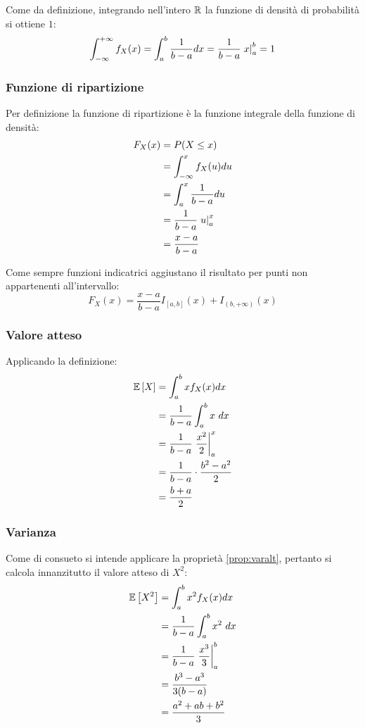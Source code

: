 Come da definizione, integrando nell'intero $\mathbb R$ la funzione di densità di probabilità si ottiene $1$:
\begin{equation*}
	\int_{-\infty}^{+\infty}f_X(x) = \int_a^b\frac{1}{b-a}dx = \frac{1}{b-a} \left. x \right\rvert_{a}^{b} = 1
\end{equation*}


\subsubsection{Funzione di ripartizione}
Per definizione la funzione di ripartizione è la funzione integrale della funzione di densità:
\begin{align*}
	F_X(x) & = P(X\leq x)                   \\
	       & = \int_{-\infty}^x f_X(u)du    \\
	       & = \int_a^x \frac{1}{b-a}du     \\
	       & = \frac{1}{b-a} \left. u \right\rvert_{a}^{x} \\
	       & = \frac{x-a}{b-a}
\end{align*}

Come sempre funzioni indicatrici aggiustano il risultato per punti non appartenenti all'intervallo:
\begin{equation*}
	F_X(x) = \frac{x-a}{b-a} I_{[a,b]}(x) + I_{(b,+\infty)}(x)
\end{equation*}


\subsubsection{Valore atteso}
Applicando la definizione:
\begin{align*}
	\mathbb{E}\left[ X \right] & = \int_a^b x f_X(x)dx                      \\
	       & = \frac{1}{b-a} \int_a^b x ~ dx            \\
	       & = \frac{1}{b-a} \left. \frac{x^2}{2} \right\rvert_{a}^{x} \\
	       & = \frac{1}{b-a} \cdot \frac{b^2-a^2}{2}    \\
	       & = \frac{b+a}{2}
\end{align*}


\subsubsection{Varianza}
Come di consueto si intende applicare la proprietà \ref{prop:varalt}, pertanto si calcola innanzitutto il valore atteso di $X^2$:
\begin{align*}
	\mathbb{E}\left[ X^2 \right] & = \int_a^b x^2 f_X(x)dx                    \\
	         & = \frac{1}{b-a}\int_a^b x^2 ~ dx           \\
	         & = \frac{1}{b-a} \left. \frac{x^3}{3} \right\rvert_{a}^{b} \\
	         & = \frac{b^3-a^3}{3(b-a)}                   \\
	         & = \frac{a^2+ab+b^2}{3}
\end{align*}

